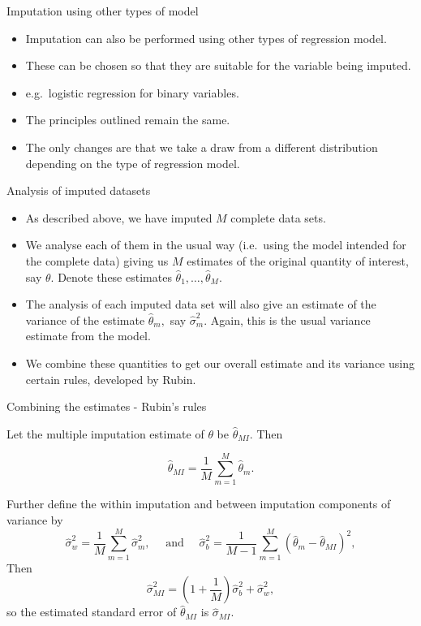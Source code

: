 \documentclass[ignorenonframetext,]{beamer}
\providecommand{\tightlist}{%
  \setlength{\itemsep}{0pt}\setlength{\parskip}{0pt}}
\begin{document}
\begin{frame}{Imputation using other types of model}
\protect\hypertarget{imputation-using-other-types-of-model}{}

\begin{itemize}
\tightlist
\item
  Imputation can also be performed using other types of regression
  model.
\item
  These can be chosen so that they are suitable for the variable being
  imputed.
\item
  e.g.~logistic regression for binary variables.
\item
  The principles outlined remain the same.
\item
  The only changes are that we take a draw from a different distribution
  depending on the type of regression model.
\end{itemize}

\end{frame}

\begin{frame}{Analysis of imputed datasets}
\protect\hypertarget{analysis-of-imputed-datasets}{}

\begin{itemize}
\tightlist
\item
  As described above, we have imputed \(M\) complete data sets.
\item
  We analyse each of them in the usual way (i.e.~using the model
  intended for the complete data) giving us \(M\) estimates of the
  original quantity of interest, say \(\theta.\) Denote these estimates
  \(\hat\theta_1,\dots,\hat\theta_M.\)
\item
  The analysis of each imputed data set will also give an estimate of
  the variance of the estimate \(\hat\theta_m,\) say \(\hat\sigma^2_m.\)
  Again, this is the usual variance estimate from the model.
\item
  We combine these quantities to get our overall estimate and its
  variance using certain rules, developed by Rubin.
\end{itemize}

\end{frame}

\begin{frame}{Combining the estimates - Rubin's rules}
\protect\hypertarget{combining-the-estimates---rubins-rules}{}

Let the multiple imputation estimate of \(\theta\) be
\(\hat\theta_{MI}.\) Then

\[\hat\theta_{MI} =\frac{1}{M} \sum_{m=1}^M \hat\theta_m.\]

Further define the within imputation and between imputation components
of variance by
\[\hat\sigma^2_w = \frac{1}{M} \sum _{m=1}^M \hat\sigma^2_m,\quad\mbox{ and } \quad \hat\sigma^2_b = \frac{1}{M-1} \sum_{m=1}^M (\hat\theta_m - \hat\theta_{MI} )^2,\]
Then
\[\hat\sigma^2_{MI} =  \left( 1 + \frac{1}{M} \right) \hat\sigma^2_b + \hat\sigma^2_w,\]
so the estimated standard error of \(\hat\theta_{MI}\) is
\(\hat\sigma_{MI}.\)

\end{frame}
\end{document}
